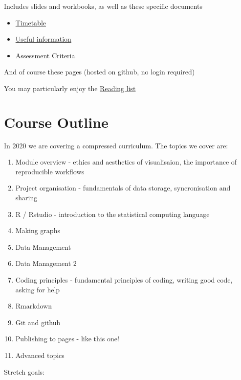 \documentclass[]{book}
\providecommand{\tightlist}{%
  \setlength{\itemsep}{0pt}\setlength{\parskip}{0pt}}
\begin{document}
Includes slides and workbooks, as well as these specific documents

\begin{itemize}
\tightlist
\item
  \href{https://docs.google.com/spreadsheets/d/1fyvjYhai6nIaOUymkUrlGIXL89cG76lI8bLXirPbaOw/edit?usp=drivesdk}{Timetable}
\item
  \href{https://docs.google.com/document/d/1kEDLaELoFyRBCsQLkZZP1PNbNaw2uUM6AAQhd42ExwQ/edit?usp=drivesdk}{Useful
  information}
\item
  \href{https://docs.google.com/spreadsheets/d/1DS91tnTtC8qPQHchAbzkOK57vvsSLIQc9FN3nPp9bQY/edit?usp=drivesdk}{Assessment
  Criteria}
\end{itemize}

And of course these pages (hosted on github, no login required)

You may particularly enjoy the \href{extra-reading.html}{Reading list}

\section{Course Outline}\label{course-outline}

In 2020 we are covering a compressed curriculum. The topics we cover
are:

\begin{enumerate}
\def\labelenumi{\arabic{enumi}.}
\tightlist
\item
  Module overview - ethics and aesthetics of visualisaion, the
  importance of reproducible workflows
\item
  Project organisation - fundamentals of data storage, syncronisation
  and sharing
\item
  R / Rstudio - introduction to the statistical computing language
\item
  Making graphs
\item
  Data Management
\item
  Data Management 2
\item
  Coding principles - fundamental principles of coding, writing good
  code, asking for help
\item
  Rmarkdown
\item
  Git and github
\item
  Publishing to pages - like this one!
\item
  Advanced topics
\end{enumerate}

Stretch goals:
\end{document}
